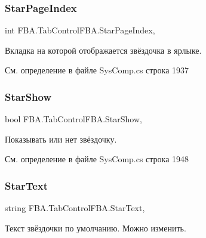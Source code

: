 \subsubsection{\texorpdfstring{Star\+Page\+Index}{StarPageIndex}}
{\footnotesize\ttfamily int F\+B\+A.\+Tab\+Control\+F\+B\+A.\+Star\+Page\+Index\hspace{0.3cm}{\ttfamily [get]}, {\ttfamily [set]}}



Вкладка на которой отображается звёздочка в ярлыке. 



См. определение в файле Sys\+Comp.\+cs строка 1937

\mbox{\label{class_f_b_a_1_1_tab_control_f_b_a_a5218bb930b19625c97a8dee7cb52a4f3}} 
\subsubsection{\texorpdfstring{Star\+Show}{StarShow}}
{\footnotesize\ttfamily bool F\+B\+A.\+Tab\+Control\+F\+B\+A.\+Star\+Show\hspace{0.3cm}{\ttfamily [get]}, {\ttfamily [set]}}



Показывать или нет звёздочку. 



См. определение в файле Sys\+Comp.\+cs строка 1948

\mbox{\label{class_f_b_a_1_1_tab_control_f_b_a_ae9ede1ab764c0923337bf63647e07fcb}} 
\subsubsection{\texorpdfstring{Star\+Text}{StarText}}
{\footnotesize\ttfamily string F\+B\+A.\+Tab\+Control\+F\+B\+A.\+Star\+Text\hspace{0.3cm}{\ttfamily [get]}, {\ttfamily [set]}}



Текст звёздочки по умолчанию. Можно изменить. 



